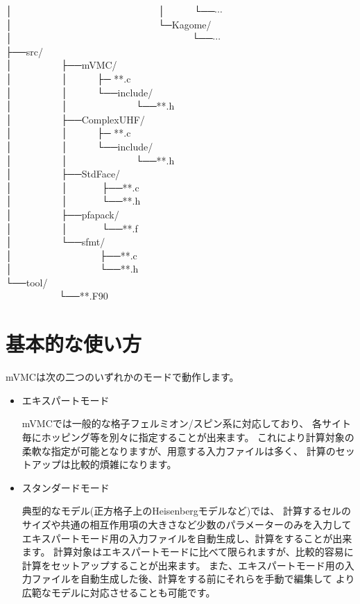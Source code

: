 │~~~~~~~~~~~~~~~~~~~~~~~~~~~~~~│~~~~~~└──$\cdots$\\
│~~~~~~~~~~~~~~~~~~~~~~~~~~~~~~└─Kagome/\\
│~~~~~~~~~~~~~~~~~~~~~~~~~~~~~~~~~~~~~└──$\cdots$\\
├──src/\\
│~~~~~~~~~~├──mVMC/\\
│~~~~~~~~~~│~~~~~~├─ **.c\\
│~~~~~~~~~~│~~~~~~└──include/\\
│~~~~~~~~~~│~~~~~~~~~~~~~~└──**.h\\
│~~~~~~~~~~├──ComplexUHF/\\
│~~~~~~~~~~│~~~~~~├─ **.c\\
│~~~~~~~~~~│~~~~~~└──include/\\
│~~~~~~~~~~│~~~~~~~~~~~~~~└──**.h\\
│~~~~~~~~~~├──StdFace/\\
│~~~~~~~~~~│~~~~~~~├──**.c\\
│~~~~~~~~~~│~~~~~~~└──**.h\\
│~~~~~~~~~~├──pfapack/\\
│~~~~~~~~~~│~~~~~~~└──**.f\\
│~~~~~~~~~~└──sfmt/\\
│~~~~~~~~~~~~~~~~~~├──**.c\\
│~~~~~~~~~~~~~~~~~~└──**.h\\
└──tool/\\
~~~~~~~~~~~└──**.F90\\

\newpage
\section{基本的な使い方}

mVMCは次の二つのいずれかのモードで動作します。
\begin{itemize}
\item エキスパートモード

  mVMCでは一般的な格子フェルミオン/スピン系に対応しており、
  各サイト毎にホッピング等を別々に指定することが出来ます。
  これにより計算対象の柔軟な指定が可能となりますが、用意する入力ファイルは多く、
  計算のセットアップは比較的煩雑になります。
  
\item スタンダードモード

  典型的なモデル(正方格子上のHeisenbergモデルなど)では、
  計算するセルのサイズや共通の相互作用項の大きさなど少数のパラメーターのみを入力して
  エキスパートモード用の入力ファイルを自動生成し、計算をすることが出来ます。
  計算対象はエキスパートモードに比べて限られますが、比較的容易に計算をセットアップすることが出来ます。
  また、エキスパートモード用の入力ファイルを自動生成した後、計算をする前にそれらを手動で編集して
  より広範なモデルに対応させることも可能です。

\end{itemize}

